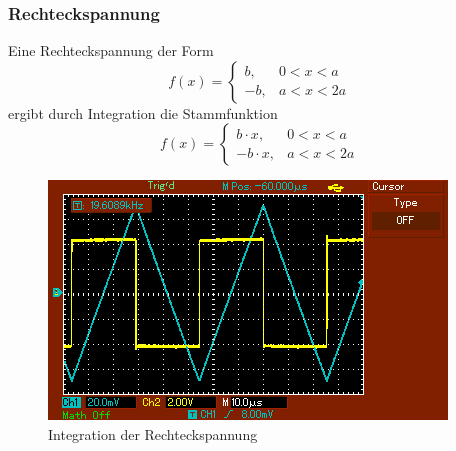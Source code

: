 \subsubsection{Rechteckspannung}
Eine Rechteckspannung der Form
\begin{equation*}
  f(x) = \begin{cases}
         b , & 0 < x < a \\
         -b , & a < x < 2a
       \end{cases}
\end{equation*}
ergibt durch Integration die Stammfunktion
\begin{equation*}
  f(x) = \begin{cases}
         b \cdot x , & 0 < x < a \\
         -b \cdot x, & a < x < 2a
       \end{cases}
\end{equation*}
\begin{figure}[H]
  \centering
  \includegraphics{rechteck.png}
  \caption{Integration der Rechteckspannung}
  \label{fig:rechteck}
\end{figure}
